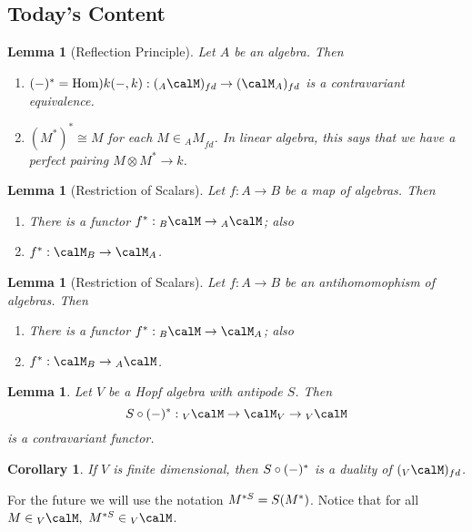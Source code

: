 \documentclass[12pt]{article}
\theoremstyle{break}
\theoremstyle{nonumberbreak}
\theoremstyle{changebreak}
\newtheorem{lem}[thm]{Lemma}
\newtheorem{cor}[thm]{Corollary}
\theoremstyle{break}
\theoremstyle{nonumberbreak}
\theoremstyle{nonumberplain}
\theoremstyle{change}
\newcommand*{\Hom}{\ensuremath\text{Hom}}
\let\tilde\relax
\newcommand*{\tilde}[1]{\widetilde{#1}}
\begin{document}
\subsection{Today's Content}
\begin{lem}[Reflection Principle]\label{lem-ref]}
	Let $A$ be an algebra. Then
	\begin{enumerate}
		\item $(-)^*=\Hom)k(-,k):({_A\calM})_{fd}\to(\calM_A)_{fd}$ is a contravariant equivalence.
		\item $(M^*)^*\cong M$ for each $M\in{_AM}_{fd}$. In linear algebra, this says that we have a perfect pairing $M\otimes M^*\to k$.
	\end{enumerate}
\end{lem}
\begin{lem}[Restriction of Scalars]\label{lem-res1]}
	Let $f:A\to B$ be a map of algebras. Then
	\begin{enumerate}
		\item There is a functor $f^*:{_B\calM}\to{_A\calM}$; also 
		\item $f^*:\calM_B\to\calM_A$.
	\end{enumerate}
\end{lem}
\begin{lem}[Restriction of Scalars]\label{lem-res2}
	Let $f:A\to B$ be an antihomomophism of algebras. Then
	\begin{enumerate}
		\item There is a functor $f^*:{_B\calM}\to{\calM_A}$; also 
		\item $f^*:\calM_B\to{_A\calM}$.
	\end{enumerate}
\end{lem}
\begin{lem}
	Let $V$ be a Hopf algebra with antipode $S$. Then 
	\[\tilde S\circ (-)^*:{_V\calM}\to \calM_V\to {_V\calM}\]
	is a contravariant functor.
\end{lem}
\begin{cor}
	If $V$ is finite dimensional, then $\tilde S\circ(-)^*$ is a duality of $(_V\calM)_{fd}$.
\end{cor}
For the future we will use the notation $M^{*S}=\tilde S(M^*)$. Notice that for all $M\in{_V\calM},$ $M^{*S}\in{_V\calM}$.
\end{document}
